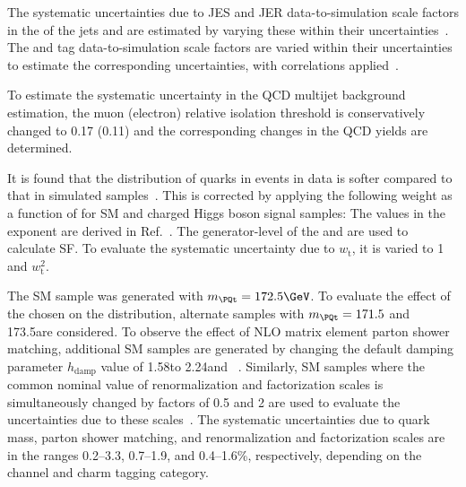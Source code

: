The systematic uncertainties due to JES and JER data-to-simulation 
scale factors in the \pt of the jets and \ptmiss are estimated by 
varying these within their uncertainties~\cite{Khachatryan:2016kdb}. 
The \PQb and \PQc tag data-to-simulation scale factors are varied 
within their uncertainties to estimate the corresponding uncertainties, 
with correlations applied~\cite{Sirunyan:2017ezt}. 

To estimate the systematic uncertainty in the QCD multijet background
estimation, the muon (electron) relative isolation threshold is
conservatively changed to 0.17 (0.11) and the corresponding changes in
the QCD yields are determined.

It is found that the \pt distribution of \PQt quarks in \ttbar events
in data is softer compared to that in simulated
samples~\cite{Khachatryan:2016mnb}. This is corrected by applying the
following weight as a function of \pt for SM \ttbar and charged Higgs
boson signal samples:
The values in the exponent are derived in Ref.~\cite{Sirunyan:2018ucr}.
The generator-level \pt of the \PQt and \PAQt are used to calculate
SF. To evaluate the systematic uncertainty due to $w_\text{t}$, it is
varied to 1 and $w_\text{t}^2$.

The SM \ttbar sample was generated with $\mt = 172.5\GeV$. To evaluate
the effect of the chosen \mt on the \mjj distribution, alternate
\ttbar samples with $\mt = 171.5$ and 173.5\GeV are considered. To
observe the effect of NLO matrix element parton shower matching,
additional SM \ttbar samples are generated by changing the default
damping parameter $h_{\text{damp}}$ value of 1.58\mt to
2.24\mt and \mt~\cite{CMS-PAS-TOP-16-021}.
Similarly, SM \ttbar samples where the common nominal value of
renormalization and factorization scales is simultaneously changed by
factors of 0.5 and 2 are used to evaluate the uncertainties due to
these scales~\cite{Butterworth:2015oua}. The systematic uncertainties
due to \PQt quark mass, parton shower matching, and renormalization
and factorization scales are in the ranges 0.2--3.3, 0.7--1.9, and
0.4--1.6\%, respectively, depending on the channel and charm tagging
category.

